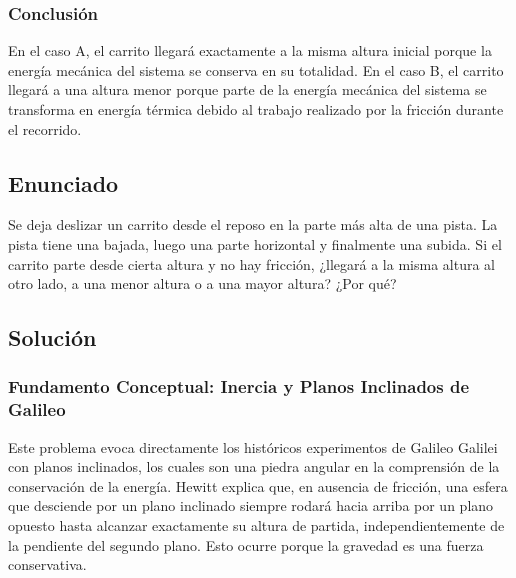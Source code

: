 \documentclass[12pt,a4paper]{article}
\begin{document}
\subsubsection*{Conclusión}
En el caso A, el carrito llegará exactamente a la misma altura inicial porque la energía mecánica del sistema se conserva en su totalidad. En el caso B, el carrito llegará a una altura menor porque parte de la energía mecánica del sistema se transforma en energía térmica debido al trabajo realizado por la fricción durante el recorrido.


\newpage
\subsection*{Enunciado}
Se deja deslizar un carrito desde el reposo en la parte más alta de una pista. La pista tiene una bajada, luego una parte horizontal y finalmente una subida. Si el carrito parte desde cierta altura y no hay fricción, ¿llegará a la misma altura al otro lado, a una menor altura o a una mayor altura? ¿Por qué?

\subsection*{Solución}

\subsubsection*{Fundamento Conceptual: Inercia y Planos Inclinados de Galileo}
Este problema evoca directamente los históricos experimentos de Galileo Galilei con planos inclinados, los cuales son una piedra angular en la comprensión de la conservación de la energía. Hewitt explica que, en ausencia de fricción, una esfera que desciende por un plano inclinado siempre rodará hacia arriba por un plano opuesto hasta alcanzar exactamente su altura de partida, independientemente de la pendiente del segundo plano. Esto ocurre porque la gravedad es una fuerza conservativa.
\end{document}
